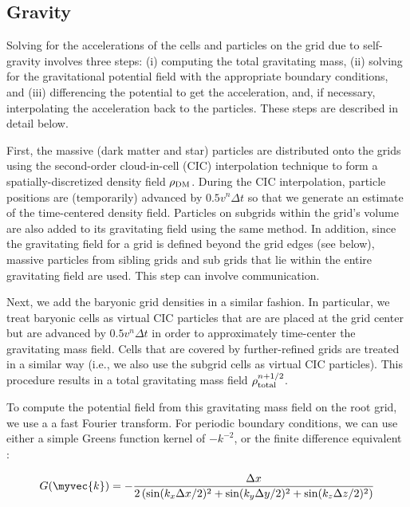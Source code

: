 \subsection{Gravity}
\label{sec.gravity}

Solving for the accelerations of the cells and particles on the grid
due to self-gravity involves three steps: (i) computing the total
gravitating mass, (ii) solving for the gravitational potential field
with the appropriate boundary conditions, and (iii) differencing the
potential to get the acceleration, and, if necessary, interpolating
the acceleration back to the particles. These steps are described in
detail below.

First, the massive (dark matter and star) particles are distributed
onto the grids using the second-order cloud-in-cell (CIC)
interpolation technique \citep{Hockney88} to form a
spatially-discretized density field $\rho_{\rm DM}$.  During the CIC
interpolation, particle positions are (temporarily) advanced by $0.5
v^n \Delta t$ so that we generate an estimate of the time-centered
density field.  Particles on subgrids within the grid's volume are
also added to its gravitating field using the same method. In
addition, since the gravitating field for a grid is defined beyond the
grid edges (see below), massive particles from sibling grids and sub
grids that lie within the entire gravitating field are used.  This
step can involve communication.

Next, we add the baryonic grid densities in a similar fashion.  In
particular, we treat baryonic cells as virtual CIC particles that are
are placed at the grid center but are advanced by $0.5 v^n \Delta t$
in order to approximately time-center the gravitating mass field.
Cells that are covered by further-refined grids are treated in a
similar way (i.e., we also use the subgrid cells as virtual CIC
particles).  This procedure results in a total gravitating mass field
$\rho_{\rm total}^{n+1/2}$.

To compute the potential field from this gravitating mass field on the
root grid, we use a a fast Fourier transform. For periodic boundary
conditions, we can use either a simple Greens function kernel of
$-k^{-2}$, or the finite difference equivalent \citep{Hockney88}:

\begin{equation}
G(\myvec{k}) = - \frac{\Delta x}{2 \left( \sin(k_x \Delta x/2)^2 + \sin(k_y \Delta y/2)^2 + \sin(k_z \Delta z/2)^2 \right) }
\end{equation}

